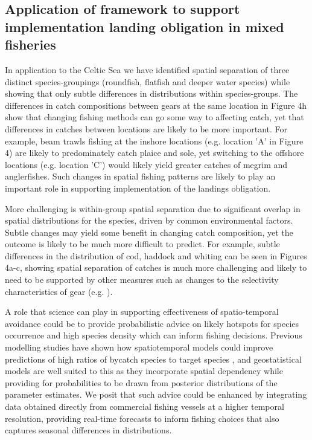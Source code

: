 \documentclass{nature}
\begin{document}
\begin{linenumbers}
\subsection{Application of framework to support implementation landing
	obligation in mixed fisheries} In application to the Celtic Sea we have
identified spatial separation of three distinct species-groupings (roundfish,
flatfish and deeper water species) while showing that only subtle differences
in distributions within species-groups. The differences in catch compositions
between gears at the same location in Figure 4h show that changing fishing
methods can go some way to affecting catch, yet that differences in catches
between locations are likely to be more important. For example, beam trawls
fishing at the inshore locations (e.g. location 'A' in Figure 4) are likely to
predominately catch plaice and sole, yet switching to the offshore locations
(e.g. location 'C') would likely yield greater catches of megrim and
anglerfishes.  Such changes in spatial fishing patterns are likely to play an
important role in supporting implementation of the landings obligation.

More challenging is within-group spatial separation due to significant overlap
in spatial distributions for the species, driven by common environmental
factors. Subtle changes may yield some benefit in changing catch composition,
yet the outcome is likely to be much more difficult to predict. For example,
subtle differences in the distribution of cod, haddock and whiting can be seen
in Figures 4a-c, showing spatial separation of catches is much more challenging
and likely to need to be supported by other measures such as changes to the
selectivity characteristics of gear (e.g. \cite{Santos2016}). 

A role that science can play in supporting effectiveness of spatio-temporal
avoidance could be to provide probabilistic advice on likely hotspots for
species occurrence and high species density which can inform fishing decisions.
Previous modelling studies have shown how spatiotemporal models could improve
predictions of high ratios of bycatch species to target species \cite{Ward2015,
	Cosandey-Godin2015, Breivik2016}, and geostatistical models are well
suited to this as they incorporate spatial dependency while providing for
probabilities to be drawn from posterior distributions of the parameter
estimates.  We posit that such advice could be enhanced by integrating data
obtained directly from commercial fishing vessels at a higher temporal
resolution, providing real-time forecasts to inform fishing choices that also
captures seasonal differences in distributions.


\end{linenumbers}
\end{document}
